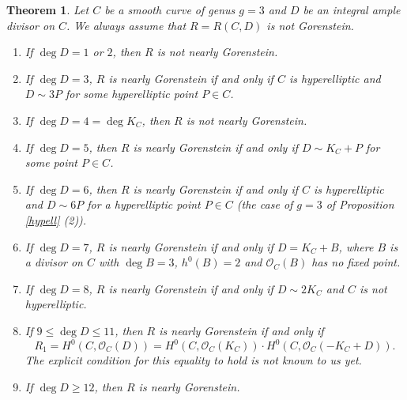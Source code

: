 \documentclass[12pt]{amsart}
\newtheorem{thm}{Theorem}[section]
\theoremstyle{definition}
\theoremstyle{remark}
\numberwithin{equation}{section}
\newcommand{\cO}{\mathcal O}
\renewcommand{\:}{\colon}
\begin{document}
\begin{thm}\label{g=3} 
Let $C$ be a smooth curve of genus $g=3$ and 
$D$ be an  integral ample divisor on $C$. 
We always assume that $R=R(C,D)$ is not Gorenstein.
\begin{enumerate}
\item  If $\deg D=1$ or $2$, then $R$ is not nearly Gorenstein.
\item If $\deg D =3$, $R$ is nearly Gorenstein if and only if $C$ is hyperelliptic and 
$D\sim 3P$ for some hyperelliptic point $P\in C$. 
\item If $\deg D = 4=\deg K_C$,  
then $R$ is not nearly  Gorenstein.  
\item If $\deg D =5$, then $R$ is nearly Gorenstein if and only if 
$D \sim K_C + P$ for some point $P\in C$. 
\item If $\deg D =6$, then $R$ is nearly  Gorenstein if and only if 
$C$ is hyperelliptic and $D\sim 6P$ for a hyperelliptic point $P\in C$
 (the case of $g=3$ of Proposition \ref{hypell} (2)). 
\item If $\deg D = 7$, $R$ is nearly Gorenstein if and only if 
$D = K_C + B$, 
where $B$ is a divisor on $C$ with $\deg B = 3$,  
$h^0(B)=2$ and $\cO_C(B)$ has no fixed point.  
\item If $\deg D = 8$, $R$ is nearly Gorenstein if and only if 
$D \sim  2 K_C$ and $C$ is not hyperelliptic. 
\item If $9 \le \deg D \le 11$, then $R$ is nearly Gorenstein if and only if 
\[
R_1 = H^0(C,\cO_C(D))= H^0(C, \cO_C(K_C))\cdot H^0(C, \cO_C(-K_C + D)).
\] 
The explicit condition for this equality to hold is not known to us yet.  
\item If $\deg D \ge 12$, then $R$ is nearly Gorenstein. 
\end{enumerate}
\end{thm}
\end{document}
